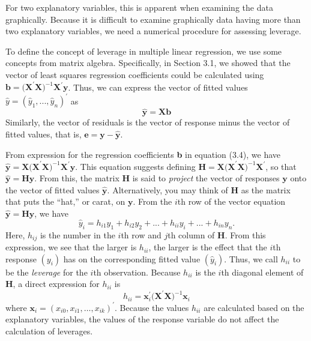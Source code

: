For two explanatory variables, this is apparent when examining the
data graphically. Because it is difficult to examine graphically
data having more than two explanatory variables, we need a numerical
procedure for assessing leverage. 


To define the concept of leverage in multiple linear regression, we
use some concepts from matrix algebra. Specifically, in Section 3.1,
we showed that the vector of least squares regression coefficients
could be calculated using
$\mathbf{b}=\mathbf{(X}^{\prime}\mathbf{X)}^{-1}\mathbf{X}^{\prime}\mathbf{y
}$. Thus, we can express the vector of fitted values
$\hat{y}=(\hat{y}_1,...,\hat{y}_n)^{\prime}$ as
\begin{equation}\label{E5:FittedValues}
\mathbf{\hat{y}}=\mathbf{Xb}
\end{equation}
Similarly, the vector of residuals is the vector of response minus
the vector of fitted values, that is,
$\mathbf{e}=\mathbf{y-\hat{y}}$.

From expression for the regression coefficients \textbf{b} in
equation (3.4), we have $\mathbf{\hat{y}}=
\mathbf{X(X}^{\prime}\mathbf{X)}^{-1}\mathbf{X}^{\prime}\mathbf{y}$.
This equation suggests defining $\mathbf{H} =
\mathbf{X(X}^{\prime}\mathbf{X)}^{-1} \mathbf{X}^{\prime}$, so that
$\mathbf{\hat{y}}=\mathbf{Hy}$. From this,
the matrix $\mathbf{H}$ is said to \textit{project} the vector of responses $%
\mathbf{y}$ onto the vector of fitted values $\mathbf{\hat{y}}$.
Alternatively, you may think of $\mathbf{H}$ as the matrix that puts
the ``hat,'' or carat, on $\mathbf{y}$. From the $i$th row of the
vector equation $\mathbf{\hat{y}=Hy}$, we have
\begin{equation*}
\hat{y}_i=h_{i1}y_1+h_{i2}y_2+...+h_{ii}y_i+...+h_{in}y_{n}.
\end{equation*}
Here, $h_{ij}$ is the number in the $i$th row and $j$th column of
$\mathbf{H} $. From this expression, we see that the larger is
$h_{ii}$, the larger is the effect that the $i$th response $(y_i)$
has on the corresponding fitted value $(\hat{y}_i)$. Thus, we call
$h_{ii}$ to be the \textit{leverage }for the $i$th observation.
Because $h_{ii}$ is the $i$th diagonal element of $\mathbf{H}$, a
direct expression for $h_{ii}$ is
\begin{equation}\label{E5:Leverage}
h_{ii}=\mathbf{x}_i^{\prime}\mathbf{(X}^{\prime}\mathbf{X)}^{-1}\mathbf{x%
}_i
\end{equation} where
$\mathbf{x}_i=(x_{i0},x_{i1},\ldots,x_{ik})^{\prime}$.
 Because the values $h_{ii}$ are calculated based on
the explanatory variables, the values of the response variable do
not affect the calculation of leverages.

